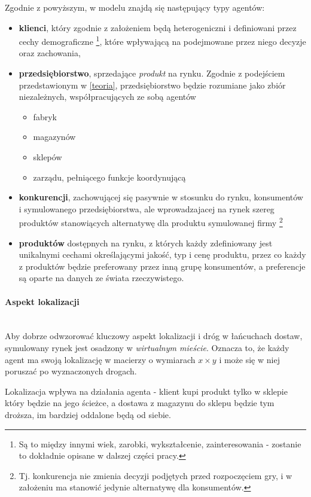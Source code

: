 \documentclass[polish, twoside, 12pt, a4paper]{article}
\theoremstyle{definition}
\theoremstyle{plain}
\theoremstyle{remark}
\begin{document}
Zgodnie z powyższym, w modelu znajdą się następujący typy agentów: 

\begin{itemize} 
	\item \textbf{klienci}, który zgodnie z założeniem będą heterogeniczni i definiowani przez cechy demograficzne \footnote{Są to między innymi wiek, zarobki, wykształcenie, zainteresowania - zostanie to dokładnie opisane w dalszej części pracy.}, które wpływającą na podejmowane przez niego decyzje oraz zachowania, 
	\item \textbf{przedsiębiorstwo}, sprzedające \textit{produkt} na rynku. Zgodnie z podejściem przedstawionym w \ref{teoria}, przedsiębiorstwo będzie rozumiane jako zbiór niezależnych, współpracujących ze sobą agentów 
		\begin{itemize}
			\item fabryk
			\item magazynów
			\item sklepów 
			\item zarządu, pełniącego funkcje koordynującą 
		\end{itemize}
	\item \textbf{konkurencji}, zachowującej się pasywnie w stosunku do rynku, konsumentów i symulowanego przedsiębiorstwa, ale wprowadzajacej na rynek szereg produktów stanowiących alternatywę dla produktu symulowanej firmy \footnote{Tj. konkurencja nie zmienia decyzji podjętych przed rozpoczęciem gry, i w założeniu ma stanowić jedynie alternatywę dla konsumentów.} 
	\item \textbf{produktów} dostępnych na rynku, z których każdy zdefiniowany jest unikalnymi cechami określającymi jakość, typ i cenę produktu, przez co każdy z produktów będzie preferowany przez inną grupę konsumentów, a preferencje są oparte na danych ze świata rzeczywistego. 
\end{itemize}

\paragraph{Aspekt lokalizacji}\mbox{}\\

Aby dobrze odwzorować kluczowy aspekt lokalizacji i dróg w łańcuchach dostaw, symulowany rynek jest osadzony w \textit{wirtualnym mieście}. Oznacza to, że każdy agent ma swoją lokalizację w macierzy o wymiarach $x \times y$ i może się w niej poruszać po wyznaczonych drogach.

Lokalizacja wpływa na działania agenta - klient kupi produkt tylko w sklepie który będzie na jego ścieżce, a dostawa z magazynu do sklepu będzie tym droższa, im bardziej oddalone będą od siebie. 
\end{document}
